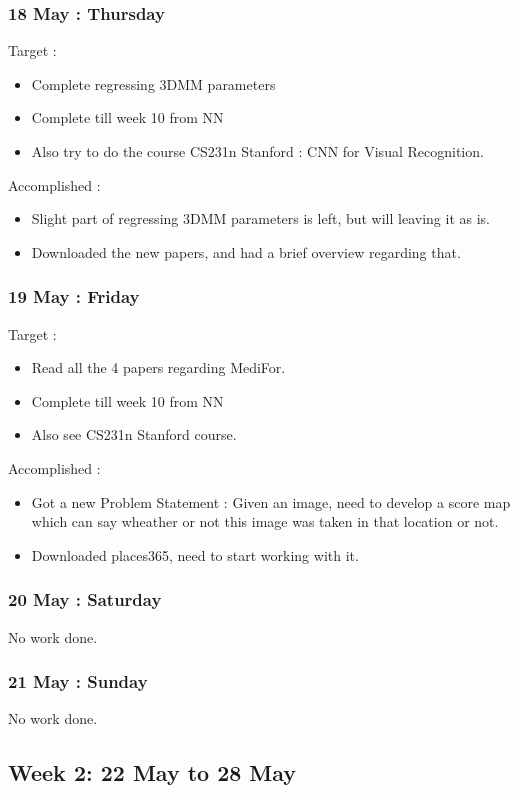 \documentclass{article}
\begin{document}
\subsubsection{18 May : Thursday}
Target :
\begin{itemize}
\item Complete regressing 3DMM parameters
\item Complete till week 10 from NN
\item Also try to do the course CS231n Stanford : CNN for Visual Recognition.
\end{itemize}
Accomplished :
\begin{itemize}
\item Slight part of regressing 3DMM parameters is left, but will leaving it as is.
\item Downloaded the new papers, and had a brief overview regarding that.
\end{itemize}

\subsubsection{19 May : Friday}
Target :
\begin{itemize}
\item Read all the  4 papers regarding MediFor.
\item Complete till week 10 from NN
\item Also see CS231n Stanford course.
\end{itemize}

Accomplished :
\begin{itemize}
\item Got a new Problem Statement :
  Given an image, need to develop a score map which can say wheather or not this image was taken in that location or not.
\item Downloaded places365, need to start working with it.
\end{itemize}

\subsubsection{20 May : Saturday}
No work done.

\subsubsection{21 May : Sunday}
No work done.

\subsection{Week 2: 22 May to 28 May}
\end{document}
